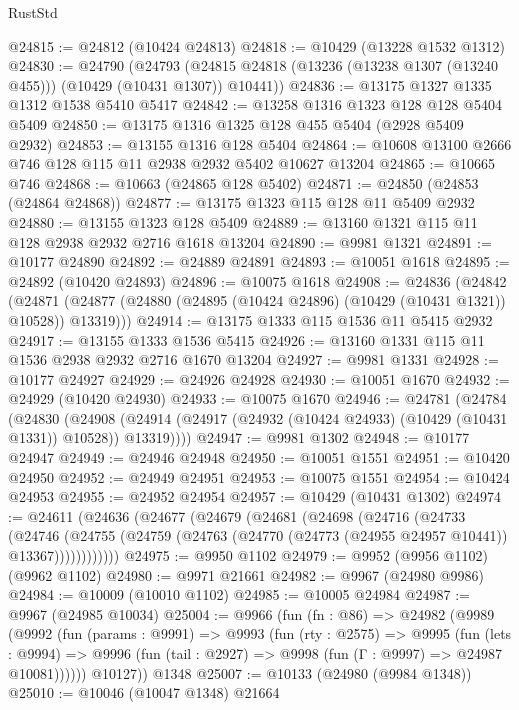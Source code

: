 \begin{lexlean}{RustStd}
\begin{coremodule}
@24815 := @24812 (@10424 @24813)
@24818 := @10429 (@13228 @1532 @1312)
@24830 := @24790
    (@24793 (@24815 @24818 (@13236 (@13238 @1307 (@13240 @455))) (@10429 (@10431 @1307)) @10441))
@24836 := @13175 @1327 @1335 @1312 @1538 @5410 @5417
@24842 := @13258 @1316 @1323 @128 @128 @5404 @5409
@24850 := @13175 @1316 @1325 @128 @455 @5404 (@2928 @5409 @2932)
@24853 := @13155 @1316 @128 @5404
@24864 := @10608 @13100 @2666 @746 @128 @115 @11 @2938 @2932 @5402 @10627 @13204
@24865 := @10665 @746
@24868 := @10663 (@24865 @128 @5402)
@24871 := @24850 (@24853 (@24864 @24868))
@24877 := @13175 @1323 @115 @128 @11 @5409 @2932
@24880 := @13155 @1323 @128 @5409
@24889 := @13160 @1321 @115 @11 @128 @2938 @2932 @2716 @1618 @13204
@24890 := @9981 @1321
@24891 := @10177 @24890
@24892 := @24889 @24891
@24893 := @10051 @1618
@24895 := @24892 (@10420 @24893)
@24896 := @10075 @1618
@24908 := @24836
    (@24842
      (@24871 (@24877 (@24880 (@24895 (@10424 @24896) (@10429 (@10431 @1321)) @10528)) @13319)))
@24914 := @13175 @1333 @115 @1536 @11 @5415 @2932
@24917 := @13155 @1333 @1536 @5415
@24926 := @13160 @1331 @115 @11 @1536 @2938 @2932 @2716 @1670 @13204
@24927 := @9981 @1331
@24928 := @10177 @24927
@24929 := @24926 @24928
@24930 := @10051 @1670
@24932 := @24929 (@10420 @24930)
@24933 := @10075 @1670
@24946 := @24781
    (@24784
      (@24830
        (@24908 (@24914 (@24917 (@24932 (@10424 @24933) (@10429 (@10431 @1331)) @10528)) @13319))))
@24947 := @9981 @1302
@24948 := @10177 @24947
@24949 := @24946 @24948
@24950 := @10051 @1551
@24951 := @10420 @24950
@24952 := @24949 @24951
@24953 := @10075 @1551
@24954 := @10424 @24953
@24955 := @24952 @24954
@24957 := @10429 (@10431 @1302)
@24974 := @24611
    (@24636
      (@24677
        (@24679
          (@24681
            (@24698
              (@24716
                (@24733
                  (@24746
                    (@24755
                      (@24759 (@24763 (@24770 (@24773 (@24955 @24957 @10441)) @13367))))))))))))
@24975 := @9950 @1102
@24979 := @9952 (@9956 @1102) (@9962 @1102)
@24980 := @9971 @21661
@24982 := @9967 (@24980 @9986)
@24984 := @10009 (@10010 @1102)
@24985 := @10005 @24984
@24987 := @9967 (@24985 @10034)
@25004 := @9966
    (fun (fn : @86) =>
    @24982
      (@9989
        (@9992
          (fun (params : @9991) =>
          @9993
            (fun (rty : @2575) =>
            @9995
              (fun (lets : @9994) =>
              @9996 (fun (tail : @2927) => @9998 (fun (Γ : @9997) => @24987 @10081))))))
        @10127))
    @1348
@25007 := @10133 (@24980 (@9984 @1348))
@25010 := @10046 (@10047 @1348) @21664

\end{coremodule}
\end{lexlean}
